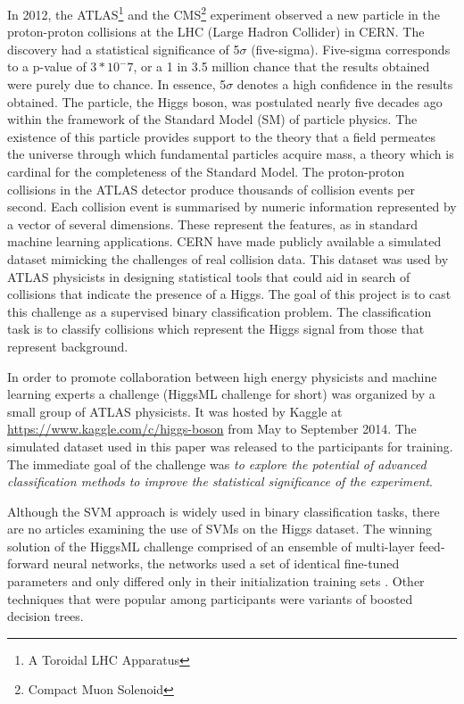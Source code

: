 \documentclass[final,3p,times,twocolumn]{elsarticle}
\begin{document}
In 2012, the ATLAS\footnote{A Toroidal LHC Apparatus} and the CMS\footnote{Compact Muon Solenoid} experiment observed a new particle in the proton-proton collisions at the LHC (Large Hadron Collider) in CERN. The discovery had a statistical significance of 5$\sigma$ (five-sigma). Five-sigma corresponds to a p-value of $3*10^-7$, or a 1 in 3.5 million chance that the results obtained were purely due to chance. In essence, 5$\sigma$ denotes a high confidence in the results obtained. The particle, the Higgs boson, was postulated nearly five decades ago within the framework of the Standard Model (SM) of particle physics. The existence of this particle provides support to the theory that a field permeates the universe through which fundamental particles acquire mass, a theory which is cardinal for the completeness of the Standard Model. The proton-proton collisions in the ATLAS detector produce thousands of collision events per second. Each collision event is summarised by numeric information represented by a vector of several dimensions. These represent the features, as in standard machine learning applications. CERN have made publicly available a simulated dataset  mimicking the challenges of real collision data. This dataset was used by ATLAS physicists in designing statistical tools that could aid in search of collisions that indicate the presence of a Higgs. The goal of this project is to cast this challenge as a supervised binary classification problem. The classification task is to classify collisions which represent the Higgs signal from those that represent background. 

In order to promote collaboration between high energy physicists and machine learning experts a challenge (HiggsML challenge for short) was organized by a small group of ATLAS physicists. It was hosted by Kaggle at  
\url{https://www.kaggle.com/c/higgs-boson} from May to September 2014. The simulated dataset used in this paper was released to the participants for training. The immediate goal of the challenge was \textit{to explore the potential of advanced classification methods to improve the statistical significance of the experiment}\cite{RM}. 

Although the SVM approach is widely used in binary classification tasks, there are no articles examining the use of SVMs on the Higgs dataset. The winning solution of the HiggsML challenge comprised of an ensemble of multi-layer feed-forward neural networks, the networks used a set of identical fine-tuned parameters and only differed  only in their initialization training sets \cite{Gabor}. Other techniques that were popular among participants were variants of boosted decision trees. 
\end{document}
